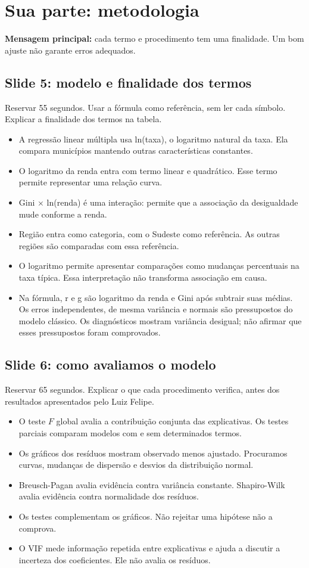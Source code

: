 \section{Sua parte: metodologia}
\textbf{Mensagem principal:} cada termo e procedimento tem uma finalidade. Um bom ajuste não garante erros adequados.
\subsection{Slide 5: modelo e finalidade dos termos}
Reservar 55 segundos. Usar a fórmula como referência, sem ler cada símbolo. Explicar a finalidade dos termos na tabela.
\begin{itemize}
\item A regressão linear múltipla usa ln(taxa), o logaritmo natural da taxa. Ela compara municípios mantendo outras características constantes.
\item O logaritmo da renda entra com termo linear e quadrático. Esse termo permite representar uma relação curva.
\item Gini $\times$ ln(renda) é uma interação: permite que a associação da desigualdade mude conforme a renda.
\item Região entra como categoria, com o Sudeste como referência. As outras regiões são comparadas com essa referência.
\item O logaritmo permite apresentar comparações como mudanças percentuais na taxa típica. Essa interpretação não transforma associação em causa.
\item Na fórmula, r e g são logaritmo da renda e Gini após subtrair suas médias. Os erros independentes, de mesma variância e normais são pressupostos do modelo clássico. Os diagnósticos mostram variância desigual; não afirmar que esses pressupostos foram comprovados.
\end{itemize}
\subsection{Slide 6: como avaliamos o modelo}
Reservar 65 segundos. Explicar o que cada procedimento verifica, antes dos resultados apresentados pelo Luiz Felipe.
\begin{itemize}
\item O teste $F$ global avalia a contribuição conjunta das explicativas. Os testes parciais comparam modelos com e sem determinados termos.
\item Os gráficos dos resíduos mostram observado menos ajustado. Procuramos curvas, mudanças de dispersão e desvios da distribuição normal.
\item Breusch-Pagan avalia evidência contra variância constante. Shapiro-Wilk avalia evidência contra normalidade dos resíduos.
\item Os testes complementam os gráficos. Não rejeitar uma hipótese não a comprova.
\item O VIF mede informação repetida entre explicativas e ajuda a discutir a incerteza dos coeficientes. Ele não avalia os resíduos.
\end{itemize}
